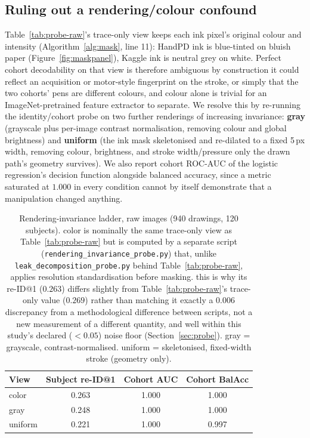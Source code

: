 \documentclass[3p,final,10pt]{elsarticle}
\let\oldsubsection\subsection
\renewcommand{\subsection}{\FloatBarrier\oldsubsection}
\begin{document}
\subsection{Ruling out a rendering/colour confound}
\label{sec:rendering-invariance}
Table~\ref{tab:probe-raw}'s trace-only view keeps each ink pixel's
original colour and intensity (Algorithm~\ref{alg:mask}, line 11): HandPD
ink is blue-tinted on bluish paper (Figure~\ref{fig:maskpanel}), Kaggle ink
is neutral grey on white. Perfect cohort decodability on that view is
therefore ambiguous by construction it could reflect an acquisition or
motor-style fingerprint on the stroke, or simply that the two cohorts'
pens are different colours, and colour alone is trivial for an
ImageNet-pretrained feature extractor to separate. We resolve this by
re-running the identity/cohort probe on two further renderings of
increasing invariance: \textbf{gray} (grayscale plus per-image contrast
normalisation, removing colour and global brightness) and
\textbf{uniform} (the ink mask skeletonised and re-dilated to a fixed
5\,px width, removing colour, brightness, and stroke width/pressure only the drawn path's geometry survives). We also report cohort
ROC-AUC of the logistic regression's decision function alongside balanced
accuracy, since a metric saturated at $1.000$ in every condition cannot by
itself demonstrate that a manipulation changed anything.

\begin{table}[H]
\centering
\caption{Rendering-invariance ladder, raw images (940 drawings, 120
subjects). color is nominally the same trace-only view as
Table~\ref{tab:probe-raw} but is computed by a separate script
(\texttt{rendering\_invariance\_probe.py}) that, unlike
\texttt{leak\_decomposition\_probe.py} behind Table~\ref{tab:probe-raw},
applies resolution standardisation before masking. this is why its re-ID@1
($0.263$) differs slightly from Table~\ref{tab:probe-raw}'s trace-only
value ($0.269$) rather than matching it exactly a $0.006$ discrepancy
from a methodological difference between scripts, not a new measurement
of a different quantity, and well within this study's declared
($<0.05$) noise floor (Section~\ref{sec:probe}). gray =
grayscale, contrast-normalised. uniform =
skeletonised, fixed-width stroke (geometry only).}
\label{tab:rendering}
\begin{tabular}{lccc}
\toprule
View & Subject re-ID@1 & Cohort AUC & Cohort BalAcc \\
\midrule
color   & 0.263 & 1.000 & 1.000 \\
gray    & 0.248 & 1.000 & 1.000 \\
uniform & 0.221 & 1.000 & 0.997 \\
\bottomrule
\end{tabular}
\end{table}
\end{document}

